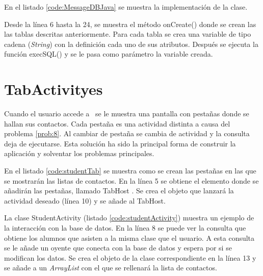 		En el listado \ref{code:MessageDBJava} se muestra la implementación de la clase.
		
		
		
		Desde la línea 6 hasta la 24, se muestra el método {\ttfamily onCreate()} donde se crean las las tablas descritas anteriormente. Para cada tabla se crea una variable de tipo cadena ({\it String}) con la definición cada uno de sus atributos. Después se ejecuta la función {\ttfamily execSQL()} y se le pasa como parámetro la variable creada.
		
	\section{\ttfamily TabActivityes}
		Cuando el usuario accede a \CollegeApp\ se le muestra una pantalla con pestañas donde se hallan sus contactos. Cada pestaña es una actividad distinta a causa del problema \ref{prob:8}. Al cambiar de pestaña se cambia de actividad y la consulta deja de ejecutarse.
		Esta solución ha sido la principal forma de construir la aplicación y solventar los problemas principales.
		
		\bigskip
		En el listado \ref{code:studentTab} se muestra como se crean las pestañas en las que se mostrarán las listas de contactos. En la línea 5 se obtiene el elemento donde se añadirán las pestañas, llamado {\ttfamily TabHost} \cite{25:tabhost:online}. Se crea el objeto que lanzará la actividad deseado (línea 10) y se añade al {\ttfamily TabHost}.
		
		
		
		\bigskip
		La clase {\ttfamily StudentActivity} (listado \ref{code:studentActivity}) muestra un ejemplo de la interacción con la base de datos. En la línea 8 se puede ver la consulta que obtiene los alumnos que asisten a la misma clase que el usuario. A esta consulta se le añade un oyente que conecta con la base de datos y espera por si se modifican los datos. Se crea el objeto de la clase correspondiente en la línea 13 y se añade a un {\it ArrayList} con el que se rellenará la lista de contactos.
		
		
	
